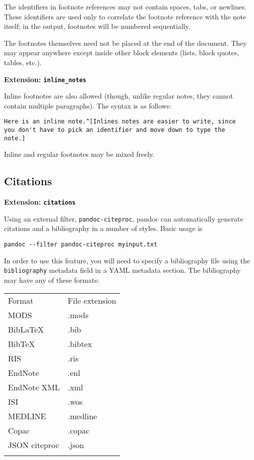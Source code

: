 \documentclass[]{article}
\begin{document}
The identifiers in footnote references may not contain spaces, tabs, or
newlines. These identifiers are used only to correlate the footnote
reference with the note itself; in the output, footnotes will be
numbered sequentially.

The footnotes themselves need not be placed at the end of the document.
They may appear anywhere except inside other block elements (lists,
block quotes, tables, etc.).

\textbf{Extension: \texttt{inline\_notes}}

Inline footnotes are also allowed (though, unlike regular notes, they
cannot contain multiple paragraphs). The syntax is as follows:

\begin{verbatim}
Here is an inline note.^[Inlines notes are easier to write, since
you don't have to pick an identifier and move down to type the
note.]
\end{verbatim}

Inline and regular footnotes may be mixed freely.

\subsection{Citations}\label{citations}

\textbf{Extension: \texttt{citations}}

Using an external filter, \texttt{pandoc-citeproc}, pandoc can
automatically generate citations and a bibliography in a number of
styles. Basic usage is

\begin{verbatim}
pandoc --filter pandoc-citeproc myinput.txt
\end{verbatim}

In order to use this feature, you will need to specify a bibliography
file using the \texttt{bibliography} metadata field in a YAML metadata
section. The bibliography may have any of these formats:

\begin{longtable}[c]{@{}ll@{}}
\toprule\addlinespace
Format & File extension
\\\addlinespace
\midrule\endhead
MODS & .mods
\\\addlinespace
BibLaTeX & .bib
\\\addlinespace
BibTeX & .bibtex
\\\addlinespace
RIS & .ris
\\\addlinespace
EndNote & .enl
\\\addlinespace
EndNote XML & .xml
\\\addlinespace
ISI & .wos
\\\addlinespace
MEDLINE & .medline
\\\addlinespace
Copac & .copac
\\\addlinespace
JSON citeproc & .json
\\\addlinespace
\bottomrule
\end{longtable}
\end{document}
